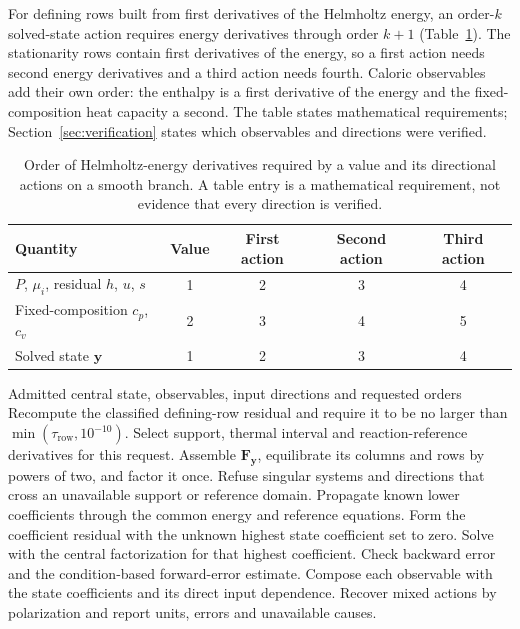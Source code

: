 For defining rows built from first derivatives of the Helmholtz energy, an order-$k$ solved-state action requires energy derivatives through order $k+1$ (Table~\ref{tab:orders}).
The stationarity rows contain first derivatives of the energy, so a first action needs second energy derivatives and a third action needs fourth.
Caloric observables add their own order: the enthalpy is a first derivative of the energy and the fixed-composition heat capacity a second.
The table states mathematical requirements; Section~\ref{sec:verification} states which observables and directions were verified.

\begin{table}[pos=htbp]
\centering
\caption{Order of Helmholtz-energy derivatives required by a value and its directional actions on a smooth branch. A table entry is a mathematical requirement, not evidence that every direction is verified.}
\label{tab:orders}
\small
\begin{tabular}{@{}lcccc@{}}
\toprule
Quantity & Value & First action & Second action & Third action \\
\midrule
$P$, $\mu_i$, residual $h$, $u$, $s$ & 1 & 2 & 3 & 4 \\
Fixed-composition $c_p$, $c_v$ & 2 & 3 & 4 & 5 \\
Solved state $\mathbf{y}$ & 1 & 2 & 3 & 4 \\
\bottomrule
\end{tabular}
\end{table}

\begin{algorithm}[tbp]
\caption{One request for exact actions of a solved equilibrium}
\label{alg:actions}
\begin{algorithmic}[1]
\Require Admitted central state, observables, input directions and requested orders
\State Recompute the classified defining-row residual and require it to be no larger than $\min(\tau_{\mathrm{row}},10^{-10})$.
\State Select support, thermal interval and reaction-reference derivatives for this request.
\State Assemble $\mathbf{F}_{\mathbf{y}}$, equilibrate its columns and rows by powers of two, and factor it once.
\State Refuse singular systems and directions that cross an unavailable support or reference domain.
\State Propagate known lower coefficients through the common energy and reference equations.
\State Form the coefficient residual with the unknown highest state coefficient set to zero.
\State Solve with the central factorization for that highest coefficient.
\State Check backward error and the condition-based forward-error estimate.
\EndFor
\State Compose each observable with the state coefficients and its direct input dependence.
\State Recover mixed actions by polarization and report units, errors and unavailable causes.
\end{algorithmic}
\end{algorithm}

